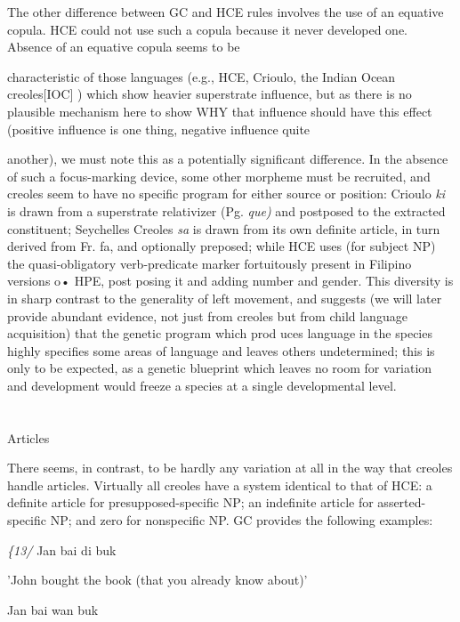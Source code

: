 The other difference between GC and HCE rules involves the use of an equative copula. HCE could not use such a copula because it never developed one. Absence of an equative copula seems to be

characteristic of those languages (e.g., HCE, Crioulo, the Indian Ocean creoles[IOC] ) which show heavier superstrate influence, but as there is no plausible mechanism here to show WHY that influence should have this effect (positive influence is one thing, negative influence quite


another), we must note this as a potentially significant difference. In the absence of such a focus-marking device, some other morpheme must be recruited, and creoles seem to have no specific program for either source or position: Crioulo \textit{ki} is drawn from a superstrate rela\-tivizer (Pg. \textit{que}\textit{)} and postposed to the extracted constituent; Seychelles Creoles \textit{sa} is drawn from its own definite article, in turn derived from Fr. fa, and optionally preposed; while HCE uses (for subject NP) the quasi-obligatory verb-predicate marker fortuitously present in Filipino versions o• HPE, post posing it and adding number and gender. This diversity is in sharp contrast to the generality of left movement, and suggests (we will later provide abundant evidence, not just from creoles but from child language acquisition) that the genetic program which prod uces language in the species highly specifies some areas of language and leaves others undetermined; this is only to be expected, as a genetic blueprint which leaves no room for variation and development would freeze a species at a single developmental level.

\section{}
Articles

There seems, in contrast, to be hardly any variation at all in the way that creoles handle articles. Virtually all creoles have a system iden\-tical to that of HCE: a definite article for presupposed-specific NP; an indefinite article for asserted-specific NP; and zero for nonspecific NP. GC provides the following examples:

\textit{\{13}\textit{/} Jan bai di buk

'John bought the book (that you already know about)'

\ea\label{ex:14}
 Jan bai wan buk
\glt
\z

